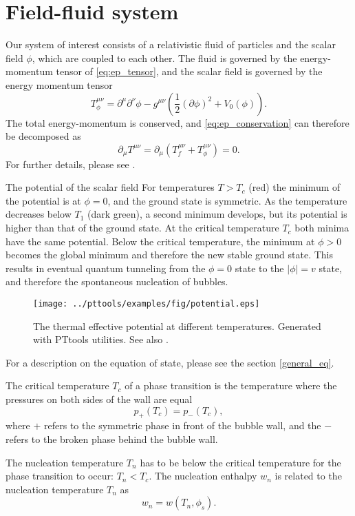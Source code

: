 \section{Field-fluid system}
Our system of interest consists of a relativistic fluid of particles and the scalar field $\phi$,
which are coupled to each other.
The fluid is governed by the energy-momentum tensor of \eqref{eq:ep_tensor},
and the scalar field is governed by the energy momentum tensor
\cites[eq. 5.12]{lecture_notes}[eq. 2.9]{hindmarsh_gw_pt_2019}
\begin{equation}
T_\phi^{\mu \nu}
= \partial^\mu \partial^\nu \phi
- g^{\mu \nu} \left(\frac{1}{2} (\partial \phi)^2 + V_0 (\phi) \right).
\label{eq:ep_tensor_field}
\end{equation}
The total energy-momentum is conserved, and \ref{eq:ep_conservation} can therefore be decomposed as
\cite[eq. 5.17]{lecture_notes}
\begin{equation}
\partial_\mu T^{\mu \nu} = \partial_\mu (T_f^{\mu \nu} + T_\phi^{\mu \nu}) = 0.
\label{eq:ep_conservation_total}
\end{equation}
For further details, please see \cite{moore_pt_1995}.

The potential of the scalar field
For temperatures $T > T_c$ (red) the minimum of the potential is at $\phi = 0$, and the ground state is symmetric.
As the temperature decreases below $T_1$ (dark green), a second minimum develops, but its potential is higher than that of the ground state.
At the critical temperature $T_c$ both minima have the same potential.
Below the critical temperature, the minimum at $\phi > 0$ becomes the global minimum and therefore the new stable ground state.
This results in eventual quantum tunneling from the $\phi = 0$ state to the $|\phi| = v$ state,
and therefore the spontaneous nucleation of bubbles.

\begin{figure}[ht!]
\centering
\texttt{[image: ../pttools/examples/fig/potential.eps]}
\caption{The thermal effective potential at different temperatures. Generated with PTtools utilities. See also \cite[fig. 4]{lecture_notes}.}
\label{fig:potential}
\end{figure}


For a description on the equation of state, please see the section \ref{general_eq}.

The critical temperature $T_c$ of a phase transition is the temperature where the pressures on both sides of the wall are equal
\begin{equation}
p_+(T_c) = p_-(T_c),
\label{eq:critical_temp}
\end{equation}
where $+$ refers to the symmetric phase in front of the bubble wall,
and the $-$ refers to the broken phase behind the bubble wall.

The nucleation temperature $T_n$ has to be below the critical temperature for the phase transition to occur: $T_n < T_c$.
The nucleation enthalpy $w_n$ is related to the nucleation temperature $T_n$ as
\begin{equation}
w_n = w(T_n,\phi_s).
\label{eq:wn}
\end{equation}
